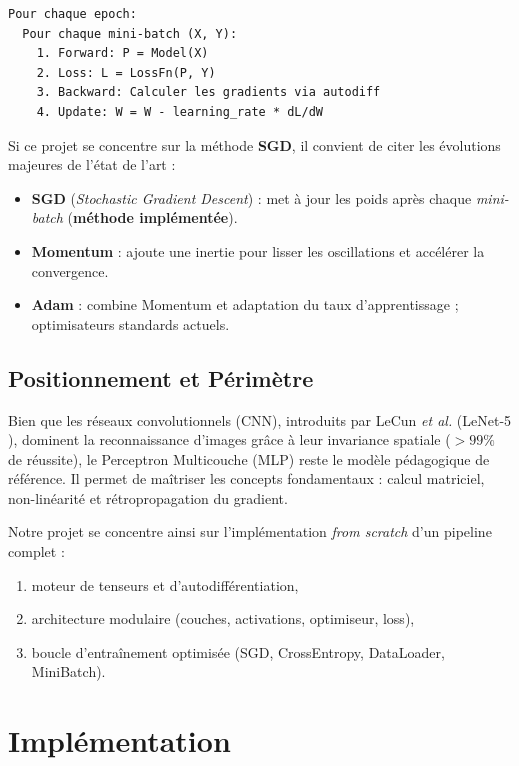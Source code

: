 \documentclass[a4paper,11pt]{article}
\begin{document}
\begin{lstlisting}[language=pseudo, caption={Algorithme simplifié (SGD)}]
Pour chaque epoch:
  Pour chaque mini-batch (X, Y):
    1. Forward: P = Model(X)
    2. Loss: L = LossFn(P, Y)
    3. Backward: Calculer les gradients via autodiff
    4. Update: W = W - learning_rate * dL/dW
\end{lstlisting}

Si ce projet se concentre sur la méthode \textbf{SGD}, il convient de citer les évolutions majeures de l'état de l'art :
\begin{itemize}
    \item \textbf{SGD} (\textit{Stochastic Gradient Descent}) : met à jour les poids après chaque \textit{mini-batch} (\textbf{méthode implémentée}).
    \item \textbf{Momentum} : ajoute une inertie pour lisser les oscillations et accélérer la convergence.
    \item \textbf{Adam} : combine Momentum et adaptation du taux d'apprentissage ; optimisateurs standards actuels.
\end{itemize}

\subsection{Positionnement et Périmètre}
Bien que les réseaux convolutionnels (CNN), introduits par LeCun \textit{et al.} (LeNet-5 \cite{lecun1998}), dominent la reconnaissance d'images grâce à leur invariance spatiale ($>99\%$ de réussite), le Perceptron Multicouche (MLP) reste le modèle pédagogique de référence. Il permet de maîtriser les concepts fondamentaux : calcul matriciel, non-linéarité et rétropropagation du gradient.

Notre projet se concentre ainsi sur l'implémentation \textit{from scratch} d'un pipeline complet :
\begin{enumerate}[label=\itshape\alph*), nosep]
  \item moteur de tenseurs et d'autodifférentiation,
  \item architecture modulaire (couches, activations, optimiseur, loss),
  \item boucle d'entraînement optimisée (SGD, CrossEntropy, DataLoader, MiniBatch).
\end{enumerate}

\clearpage

\section{Implémentation}
\end{document}
